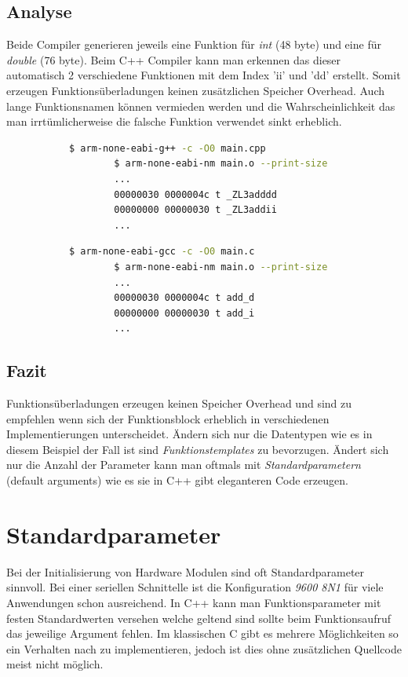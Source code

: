 \documentclass[MES,Master,ngerman]{twbook}%
\begin{document}
\subsection{Analyse}
Beide Compiler generieren jeweils eine Funktion für \textit{int} (48 byte) und eine für \textit{double} (76 byte). Beim C++ Compiler kann man erkennen das dieser automatisch 2 verschiedene Funktionen mit dem Index 'ii' und 'dd' erstellt. Somit erzeugen Funktionsüberladungen keinen zusätzlichen Speicher Overhead. Auch lange Funktionsnamen können vermieden werden und die Wahrscheinlichkeit das man irrtümlicherweise die falsche Funktion verwendet sinkt erheblich.
\begin{figure}[!htb]
	\begin{subfigure}[b]{0.5\textwidth}
		\begin{lstlisting}[gobble=6, title={Analyse C++}, language=bash, numbers=none]
		$ arm-none-eabi-g++ -c -O0 main.cpp
		$ arm-none-eabi-nm main.o --print-size
		...
		00000030 0000004c t _ZL3adddd
		00000000 00000030 t _ZL3addii
		...
		\end{lstlisting}
	\end{subfigure}
	\begin{subfigure}[b]{0.5\textwidth}
		\begin{lstlisting}[gobble=6, title={Analyse C}, language=bash, numbers=none]
		$ arm-none-eabi-gcc -c -O0 main.c
		$ arm-none-eabi-nm main.o --print-size
		...
		00000030 0000004c t add_d
		00000000 00000030 t add_i
		...
		\end{lstlisting}
	\end{subfigure}
\end{figure}

\subsection{Fazit}
Funktionsüberladungen erzeugen keinen Speicher Overhead und sind zu empfehlen wenn sich der Funktionsblock erheblich in verschiedenen Implementierungen unterscheidet. Ändern sich nur die Datentypen wie es in diesem Beispiel der Fall ist sind \textit{Funktionstemplates} zu bevorzugen. Ändert sich nur die Anzahl der Parameter kann man oftmals mit \textit{Standardparametern} (default arguments) wie es sie in C++ gibt eleganteren Code erzeugen.

\newpage
\section{Standardparameter}
Bei der Initialisierung von Hardware Modulen sind oft Standardparameter sinnvoll. Bei einer seriellen Schnittelle ist die Konfiguration \textit{9600 8N1} für viele Anwendungen schon ausreichend. In C++ kann man Funktionsparameter mit festen Standardwerten versehen welche geltend sind sollte beim Funktionsaufruf das jeweilige Argument fehlen. Im klassischen C gibt es mehrere Möglichkeiten so ein Verhalten nach zu implementieren, jedoch ist dies ohne zusätzlichen Quellcode meist nicht möglich.
\end{document}
